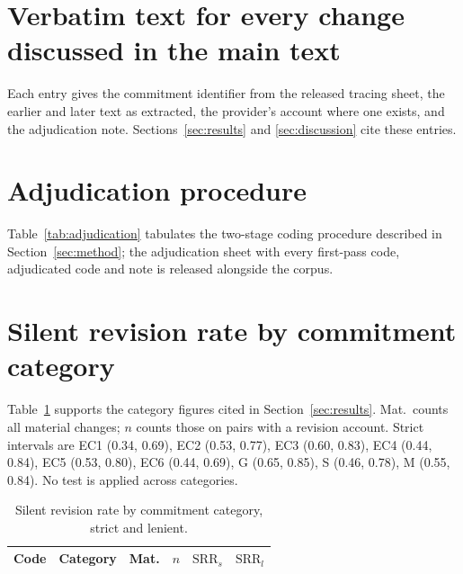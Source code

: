 \documentclass{article}
\newcommand{\srr}{\mathrm{SRR}}
\begin{document}
\section{Verbatim text for every change discussed in the main text}
\label{apx:examples}
Each entry gives the commitment identifier from the released tracing sheet, the earlier and later text as extracted, the provider's account where one exists, and the adjudication note. Sections~\ref{sec:results} and \ref{sec:discussion} cite these entries.
\sloppy


\section{Adjudication procedure}
\label{apx:adjudication}
Table~\ref{tab:adjudication} tabulates the two-stage coding procedure described in Section~\ref{sec:method}; the adjudication sheet with every first-pass code, adjudicated code and note is released alongside the corpus.
\begin{table}[tbp]\centering\small
\caption{Coding and adjudication counts.}
\label{tab:adjudication}

\end{table}

\section{Silent revision rate by commitment category}
\label{apx:category}
Table~\ref{tab:cat} supports the category figures cited in Section~\ref{sec:results}. Mat.\ counts all material changes; $n$ counts those on pairs with a revision account. Strict intervals are EC1 (0.34, 0.69), EC2 (0.53, 0.77), EC3 (0.60, 0.83), EC4 (0.44, 0.84), EC5 (0.53, 0.80), EC6 (0.44, 0.69), G (0.65, 0.85), S (0.46, 0.78), M (0.55, 0.84). No test is applied across categories.
\begin{table}[tbp]\centering\small
\caption{Silent revision rate by commitment category, strict and lenient.}
\label{tab:cat}
\begin{tabular}{llrrrr}
\toprule Code & Category & Mat. & $n$ & $\srr_s$ & $\srr_l$ \\ \midrule

\end{tabular}
\end{table}
\end{document}
